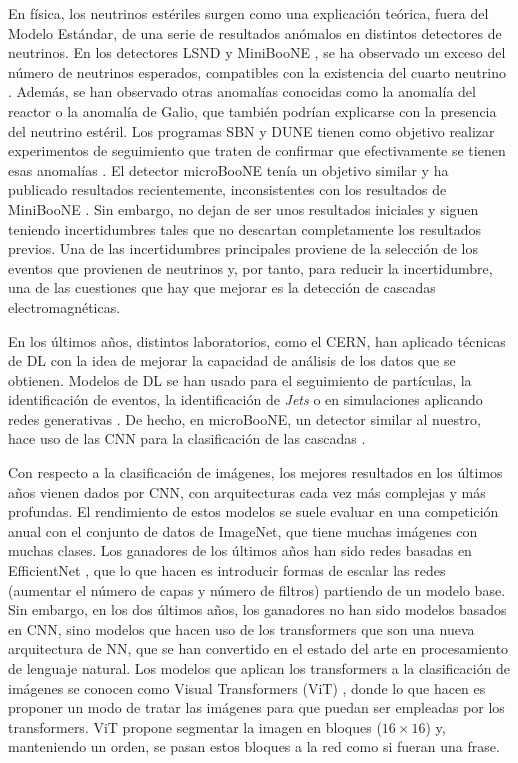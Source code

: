 \documentclass[a4paper,12pt,oneside,titlepage]{book}
\begin{document}
En física, los neutrinos estériles surgen como una explicación teórica, fuera del Modelo Estándar, de una serie de resultados anómalos en distintos detectores de neutrinos. En los detectores LSND \cite{lsnd} y MiniBooNE \cite{miniboo}, se ha observado un exceso del número de neutrinos esperados, compatibles con la existencia del cuarto neutrino \cite{sbnd}. Además, se han observado otras anomalías conocidas como la anomalía del reactor o la anomalía de Galio, que también podrían explicarse con la presencia del neutrino estéril. Los programas SBN y DUNE tienen como objetivo realizar experimentos de seguimiento que traten de confirmar que efectivamente se tienen esas anomalías \cite{sbnd, dune}. El detector microBooNE \cite{microboo} tenía un objetivo similar y ha publicado resultados recientemente, inconsistentes con los resultados de MiniBooNE \cite{micro_res}. Sin embargo, no dejan de ser unos resultados iniciales y siguen teniendo incertidumbres tales que no descartan completamente los resultados previos. Una de las incertidumbres principales proviene de la selección de los eventos que provienen de neutrinos y, por tanto, para reducir la incertidumbre, una de las cuestiones que hay que mejorar es la detección de cascadas electromagnéticas. 

En los últimos años, distintos laboratorios, como el CERN, han aplicado técnicas de DL \cite{ml_phy} con la idea de mejorar la capacidad de análisis de los datos que se obtienen. Modelos de DL se han usado para el seguimiento de partículas, la identificación de eventos, la identificación de \textit{Jets} o en simulaciones aplicando redes generativas \cite{dl_phy, dl_lhc, alb_1, alb_2}. De hecho, en microBooNE, un detector similar al nuestro, hace uso de las CNN para la clasificación de las cascadas \cite{ml_phy}.

Con respecto a la clasificación de imágenes, los mejores resultados en los últimos años vienen dados por CNN, con arquitecturas cada vez más complejas y más profundas. El rendimiento de estos modelos se suele evaluar en una competición anual con el conjunto de datos de ImageNet, que tiene muchas imágenes con muchas clases. Los ganadores de los últimos años han sido redes basadas en EfficientNet \cite{efficientnet}, que lo que hacen es introducir formas de escalar las redes (aumentar el número de capas y número de filtros) partiendo de un modelo base. Sin embargo, en los dos últimos años, los ganadores no han sido modelos basados en CNN, sino modelos que hacen uso de los transformers \cite{transformers} que son una nueva arquitectura de NN, que se han convertido en el estado del arte en procesamiento de lenguaje natural. Los modelos que aplican los transformers a la clasificación de imágenes se conocen como Visual Transformers (ViT) \cite{vit}, donde lo que hacen es proponer un modo de tratar las imágenes para que puedan ser empleadas por los transformers. ViT propone segmentar la imagen en bloques ($16\times 16$) y, manteniendo un orden, se pasan estos bloques a la red como si fueran una frase.
\end{document}
